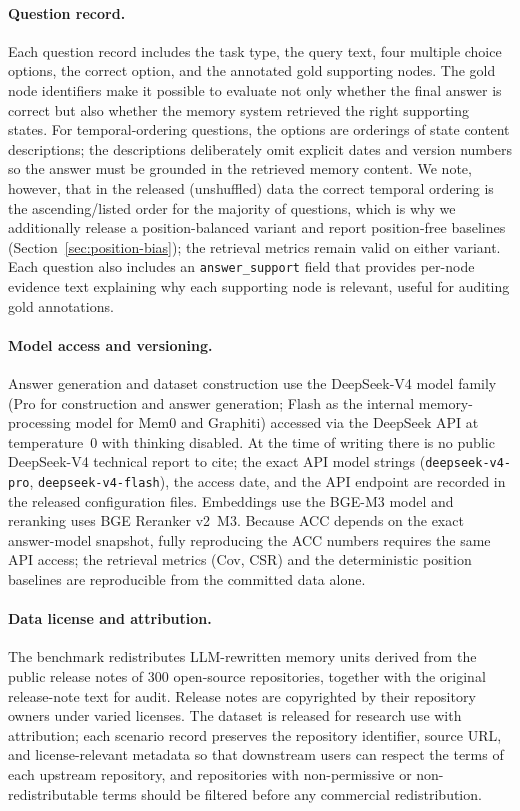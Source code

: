 \paragraph{Question record.}
Each question record includes the task type, the query text, four multiple choice options, the correct option, and the annotated gold supporting nodes. The gold node identifiers make it possible to evaluate not only whether the final answer is correct but also whether the memory system retrieved the right supporting states. For temporal-ordering questions, the options are orderings of state content descriptions; the descriptions deliberately omit explicit dates and version numbers so the answer must be grounded in the retrieved memory content. We note, however, that in the released (unshuffled) data the correct temporal ordering is the ascending/listed order for the majority of questions, which is why we additionally release a position-balanced variant and report position-free baselines (Section~\ref{sec:position-bias}); the retrieval metrics remain valid on either variant. Each question also includes an \texttt{answer\_support} field that provides per-node evidence text explaining why each supporting node is relevant, useful for auditing gold annotations.

\paragraph{Model access and versioning.}
Answer generation and dataset construction use the DeepSeek-V4 model family (Pro for construction and answer generation; Flash as the internal memory-processing model for Mem0 and Graphiti) accessed via the DeepSeek API at temperature~0 with thinking disabled. At the time of writing there is no public DeepSeek-V4 technical report to cite; the exact API model strings (\texttt{deepseek-v4-pro}, \texttt{deepseek-v4-flash}), the access date, and the API endpoint are recorded in the released configuration files. Embeddings use the BGE-M3 model and reranking uses BGE Reranker v2~M3. Because ACC depends on the exact answer-model snapshot, fully reproducing the ACC numbers requires the same API access; the retrieval metrics (Cov, CSR) and the deterministic position baselines are reproducible from the committed data alone.

\paragraph{Data license and attribution.}
The benchmark redistributes LLM-rewritten memory units derived from the public release notes of 300 open-source repositories, together with the original release-note text for audit. Release notes are copyrighted by their repository owners under varied licenses. The dataset is released for research use with attribution; each scenario record preserves the repository identifier, source URL, and license-relevant metadata so that downstream users can respect the terms of each upstream repository, and repositories with non-permissive or non-redistributable terms should be filtered before any commercial redistribution.

